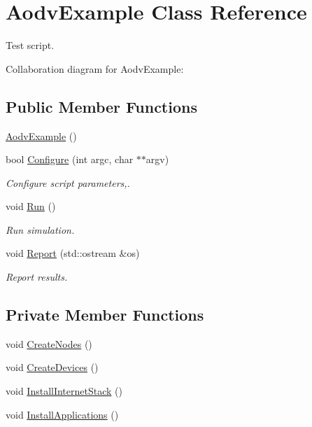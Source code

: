 \hypertarget{classAodvExample}{}\section{Aodv\+Example Class Reference}
\label{classAodvExample}


Test script.  




Collaboration diagram for Aodv\+Example\+:
\subsection*{Public Member Functions}
\begin{DoxyCompactItemize}
\item 
\hyperlink{classAodvExample_ae088b79a280faec177faec7c15a30c62}{Aodv\+Example} ()
\item 
bool \hyperlink{classAodvExample_a0700a4fd53f852f3eeca33d4721cc548}{Configure} (int argc, char $\ast$$\ast$argv)
\begin{DoxyCompactList}\small\item\em Configure script parameters,. \end{DoxyCompactList}\item 
void \hyperlink{classAodvExample_a954ace72fd69c0a09193047d33d9ad61}{Run} ()
\begin{DoxyCompactList}\small\item\em Run simulation. \end{DoxyCompactList}\item 
void \hyperlink{classAodvExample_a9ad0d438ce714e182d8a9b91521192e1}{Report} (std\+::ostream \&os)
\begin{DoxyCompactList}\small\item\em Report results. \end{DoxyCompactList}\end{DoxyCompactItemize}
\subsection*{Private Member Functions}
\begin{DoxyCompactItemize}
\item 
void \hyperlink{classAodvExample_a8f39319e44e5bae98359b0b11f905281}{Create\+Nodes} ()
\item 
void \hyperlink{classAodvExample_a0e9be9e9b05169dfe7d440ac2dfa3252}{Create\+Devices} ()
\item 
void \hyperlink{classAodvExample_abc2e6b6dd4791571042bc65a1340efd5}{Install\+Internet\+Stack} ()
\item 
void \hyperlink{classAodvExample_a181ce6b0304fa53ac0db6cb0228f93f7}{Install\+Applications} ()
\end{DoxyCompactItemize}
